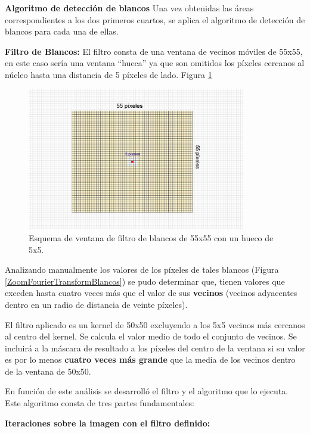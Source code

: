 \documentclass[10pt,a4paper, twoside]{report}
\newcounter{subsubsubsection}[subsubsection]
\begin{document}
\textbf{Algoritmo de detección de blancos}
Una vez obtenidas las áreas correspondientes a los dos primeros cuartos, se aplica el algoritmo de detección de blancos para cada una de ellas.

\textbf{Filtro de Blancos:} El filtro consta de una ventana de vecinos móviles de 55x55, en este caso sería una ventana "`hueca"' ya que son omitidos los píxeles cercanos al núcleo hasta una distancia de 5 píxeles de lado. Figura \ref{filtroBlancosFourier}

\begin{figure}[!htb]
   \centering      
   \includegraphics[width=0.85\textwidth]{imagenes/filtroBlancosFourier.jpg}
 \caption{Esquema de ventana de filtro de blancos de 55x55 con un hueco de 5x5.}
 \label{filtroBlancosFourier}
\end{figure}

Analizando manualmente los valores de los píxeles de tales blancos (Figura \ref{ZoomFourierTransformBlancos}) se pudo determinar que, tienen valores que exceden hasta cuatro veces más que el valor de sus \textbf{vecinos} (vecinos adyacentes dentro en un radio de distancia de veinte píxeles). 

 El filtro aplicado es un kernel de 50x50 excluyendo a los 5x5 vecinos más cercanos al centro del kernel. Se calcula el valor medio de todo el conjunto de vecinos. Se incluirá a la máscara de resultado a los píxeles del centro de la ventana si su valor es por lo menos \textbf{cuatro veces más grande} que la media de los vecinos dentro de la ventana de 50x50.

En función de este análisis se desarrolló el filtro y el algoritmo que lo ejecuta. Este algoritmo consta de tres partes fundamentales:

\textbf{Iteraciones sobre la imagen con el filtro definido:}
\end{document}
